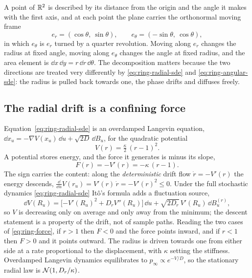 A point of $\mathbb{R}^2$ is described by its distance from the origin and the angle it
makes with the first axis, and at each point the plane carries the orthonormal
moving frame
\begin{equation}
  e_r = (\cos\theta,\ \sin\theta), \qquad
  e_\theta = (-\sin\theta,\ \cos\theta) ,
  \label{eq:ring-moving-frame}
\end{equation}
in which $e_\theta$ is $e_r$ turned by a quarter revolution. Moving along $e_r$
changes the radius at fixed angle, moving along $e_\theta$ changes the angle at
fixed radius, and the area element is $\dd x\,\dd y = r\,\dd r\,\dd\theta$. The
decomposition matters because the two directions are treated very differently
by \eqref{eq:ring-radial-sde} and \eqref{eq:ring-angular-sde}: the radius is
pulled back towards one, the phase drifts and diffuses freely.

\subsection{The radial drift is a confining force}

Equation~\eqref{eq:ring-radial-sde} is an overdamped Langevin equation,
$\dd x_u = -\nabla V(x_u)\,\dd u + \sqrt{2D}\,\dd B_u$, for the quadratic
potential
\begin{equation}
  V(r) = \tfrac{\kappa}{2}\,(r-1)^2 .
  \label{eq:ring-potential}
\end{equation}
A potential stores energy, and the force it generates is minus its slope,
\begin{equation}
  F(r) = -V'(r) = -\kappa\,(r-1) .
  \label{eq:ring-force}
\end{equation}
The sign carries the content: along the \emph{deterministic} drift flow
$\dot r = -V'(r)$ the energy descends,
$\tfrac{\dd}{\dd u} V(r_u) = V'(r)\,\dot r = -V'(r)^2 \le 0$. Under the full
stochastic dynamics \eqref{eq:ring-radial-sde} It\^o's formula adds a
fluctuation source,
\begin{equation}
  \dd V(R_u)
  = \big[{-V'(R_u)^2} + D_r V''(R_u)\big]\,\dd u
  + \sqrt{2D_r}\,V'(R_u)\,\dd B_u^{(r)},
  \label{eq:ring-ito-energy}
\end{equation}
so $V$ is decreasing only on average and only away from the minimum; the
descent statement is a property of the drift, not of sample paths. Reading the
two cases of \eqref{eq:ring-force}, if $r > 1$ then $F < 0$ and the force points
inward, and if $r < 1$ then $F > 0$ and it points outward. The radius is driven
towards one from either side at a rate proportional to the displacement, with
$\kappa$ setting the stiffness. Overdamped Langevin dynamics equilibrates to
$p_\infty \propto e^{-V/D}$, so the stationary radial law is
$\mathcal{N}(1, D_r/\kappa)$.

